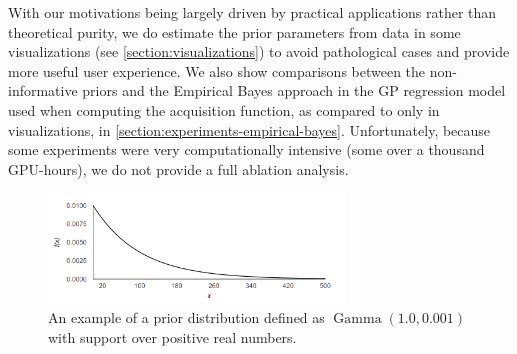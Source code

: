 With our motivations being largely driven by practical applications rather than
theoretical purity, we do estimate the prior parameters from data in some
visualizations (see \autoref{section:visualizations}) to avoid pathological
cases and provide more useful user experience. We also show comparisons between
the non-informative priors and the Empirical Bayes approach in the GP
regression model used when computing the acquisition function, as compared to
only in visualizations, in \autoref{section:experiments-empirical-bayes}.
Unfortunately, because some experiments were very computationally intensive
(some over a thousand GPU-hours), we do not provide a full ablation analysis.

\begin{figure}
	\begin{center}
		\includegraphics[width=0.7\textwidth]{images/gamma-prior.png}
		\caption{An example of a prior distribution defined as $\operatorname{Gamma}(1.0, 0.001)$ with support over positive real numbers.}
		\label{figure:gamma-prior}
	\end{center}
\end{figure}

